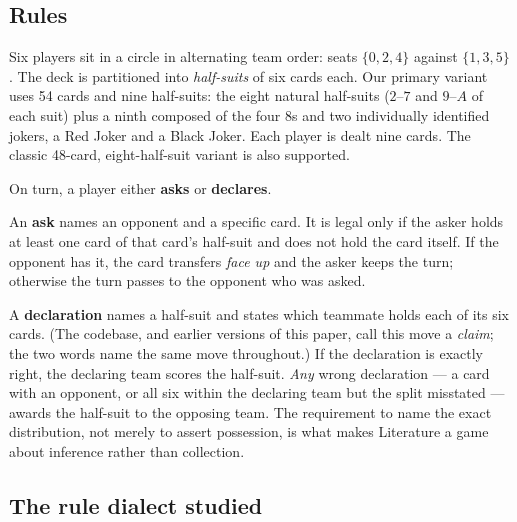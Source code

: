 \documentclass[11pt,letterpaper]{article}
\begin{document}
\subsection{Rules}

Six players sit in a circle in alternating team order: seats $\{0,2,4\}$
against $\{1,3,5\}$. The deck is partitioned into \emph{half-suits} of six
cards each. Our primary variant uses 54 cards and nine half-suits: the eight
natural half-suits ($2$--$7$ and $9$--$A$ of each suit) plus a ninth composed
of the four $8$s and two individually identified jokers, a Red Joker and a
Black Joker. Each player is dealt nine cards. The classic 48-card,
eight-half-suit variant is also supported.

On turn, a player either \textbf{asks} or \textbf{declares}.

An \textbf{ask} names an opponent and a specific card. It is legal only if the
asker holds at least one card of that card's half-suit and does not hold the
card itself. If the opponent has it, the card transfers \emph{face up} and the
asker keeps the turn; otherwise the turn passes to the opponent who was asked.

A \textbf{declaration} names a half-suit and states which teammate holds each
of its six cards. (The codebase, and earlier versions of this paper, call
this move a \emph{claim}; the two words name the same move throughout.) If
the declaration is exactly right, the declaring team scores the half-suit.
\emph{Any} wrong declaration --- a card with an opponent, or all six within
the declaring team but the split misstated --- awards the half-suit to the
opposing team. The requirement to name the exact distribution, not merely to
assert possession, is what makes Literature a game about inference rather
than collection.

\subsection{The rule dialect studied}
\end{document}
